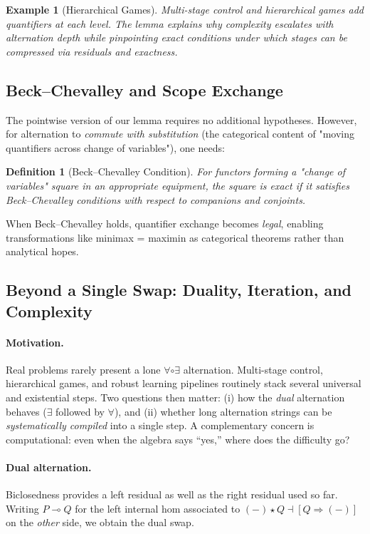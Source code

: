 \documentclass[11pt]{article}
\numberwithin{equation}{section}
\theoremstyle{upright}
\newtheorem{definition}{Definition}
\newtheorem{example}[theorem]{Example}
\begin{document}
\begin{example}[Hierarchical Games]
Multi-stage control and hierarchical games add quantifiers at each level. The lemma explains why complexity escalates with alternation depth while pinpointing exact conditions under which stages can be compressed via residuals and exactness.
\end{example}

\subsection{Beck--Chevalley and Scope Exchange}

The pointwise version of our lemma requires no additional hypotheses. However, for alternation to \emph{commute with substitution} (the categorical content of "moving quantifiers across change of variables"), one needs:

\begin{definition}[Beck--Chevalley Condition]
For functors forming a "change of variables" square in an appropriate equipment, the square is \emph{exact} if it satisfies Beck--Chevalley conditions with respect to companions and conjoints.
\end{definition}

When Beck--Chevalley holds, quantifier exchange becomes \emph{legal}, enabling transformations like minimax = maximin as categorical theorems rather than analytical hopes.

\subsection{Beyond a Single Swap: Duality, Iteration, and Complexity}
\label{sec:duality-iteration-complexity}

\paragraph{Motivation.}
Real problems rarely present a lone $\forall\circ\exists$ alternation. Multi-stage control, hierarchical games, and robust learning pipelines routinely stack several universal and existential steps. Two questions then matter: (i) how the \emph{dual} alternation behaves ($\exists$ followed by $\forall$), and (ii) whether long alternation strings can be \emph{systematically compiled} into a single step. A complementary concern is computational: even when the algebra says “yes,” where does the difficulty go?

\paragraph{Dual alternation.}
Biclosedness provides a left residual as well as the right residual used so far. Writing $P\multimap Q$ for the left internal hom associated to $(-)\star Q\dashv [Q\Rightarrow(-)]$ on the \emph{other} side, we obtain the dual swap.
\end{document}
